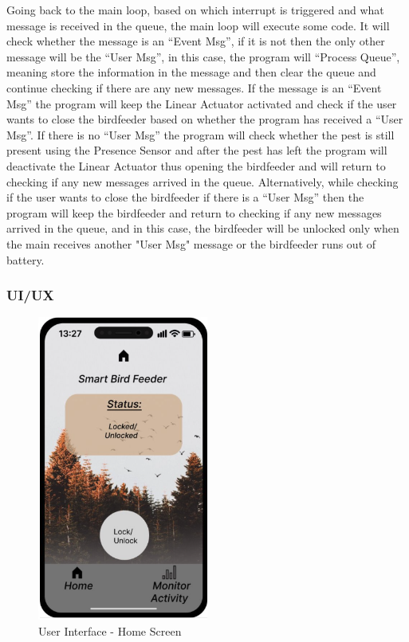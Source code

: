 \documentclass[12pt,a4paper]{article}
\begin{document}
Going back to the main loop, based on which interrupt is triggered and what message is received in the queue, the main loop will execute some code. It will check whether the message is an “Event Msg”, if it is not then the only other message will be the “User Msg”, in this case, the program will “Process Queue”, meaning store the information in the message and then clear the queue and continue checking if there are any new messages. If the message is an “Event Msg” the program will keep the Linear Actuator activated and check if the user wants to close the birdfeeder based on whether the program has received a “User Msg”. If there is no “User Msg” the program will check whether the pest is still present using the Presence Sensor and after the pest has left the program will deactivate the Linear Actuator thus opening the birdfeeder and will return to checking if any new messages arrived in the queue. Alternatively, while checking if the user wants to close the birdfeeder if there is a “User Msg” then the program will keep the birdfeeder and return to checking if any new messages arrived in the queue, and in this case, the birdfeeder will be unlocked only when the main receives another "User Msg" message or the birdfeeder runs out of battery. 
\subsubsection{UI/UX}

\begin{figure}[h]
    \centering
    \includegraphics[width=0.5\textwidth]{images/UI_Home.png}
    \caption{User Interface - Home Screen}
\end{figure}
\end{document}
